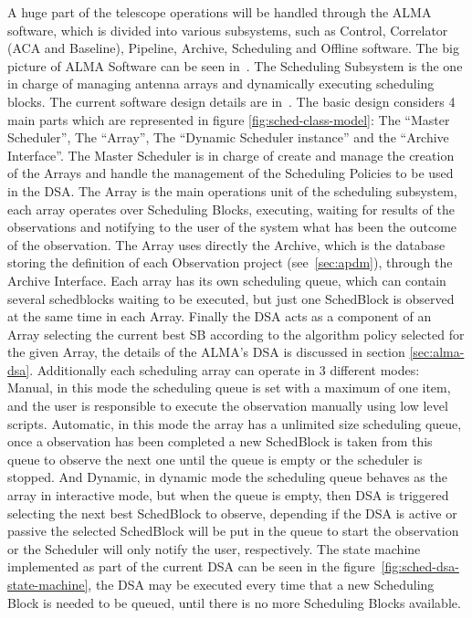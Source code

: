 A huge part of the telescope operations will be handled through the ALMA software, which is divided into various subsystems, such as Control, Correlator (ACA and Baseline), Pipeline, Archive, Scheduling and Offline software. The big picture of ALMA Software can be seen in~\cite{schwarz04}.
The Scheduling Subsystem is the one in charge of managing antenna arrays and dynamically executing scheduling blocks. The current software design details are in~\cite{clarke12}. The basic design considers 4 main parts which are represented in figure \ref{fig:sched-class-model}: The ``Master Scheduler'', The ``Array'', The ``Dynamic Scheduler instance'' and the ``Archive Interface''. The Master Scheduler is in charge of create and manage the creation of the Arrays and handle the management of the Scheduling Policies to be used in the DSA. The Array is the main operations unit of the scheduling subsystem, each array operates over Scheduling Blocks, executing, waiting for results of the observations and notifying to the user of the system what has been the outcome of the observation. The Array uses directly the Archive, which is the database storing the definition of each Observation project (see~\ref{sec:apdm}), through the Archive Interface. Each array has its own scheduling queue, which can contain several schedblocks waiting to be executed, but just one SchedBlock is observed at the same time in each Array. Finally the DSA acts as a component of an Array selecting the current best SB according to the algorithm policy selected for the given Array, the details of the ALMA's DSA is discussed in section \ref{sec:alma-dsa}. Additionally each scheduling array can operate in 3 different modes: Manual, in this mode the scheduling queue is set with a maximum of one item, and the user is responsible to execute the observation manually using low level scripts. Automatic, in this mode the array has a unlimited size scheduling queue, once a observation has been completed a new SchedBlock is taken from this queue to observe the next one until the queue is empty or the scheduler is stopped. And Dynamic, in dynamic mode the scheduling queue behaves as the array in interactive mode, but when the queue is empty, then DSA is triggered selecting the next best SchedBlock to observe, depending if the DSA is active or passive the selected SchedBlock will be put in the queue to start the observation or the Scheduler will only notify the user, respectively. The state machine implemented as part of the current DSA can be seen in the figure~\ref{fig:sched-dsa-state-machine}, the DSA may be executed every time that a new Scheduling Block is needed to be queued, until there is no more Scheduling Blocks available.


